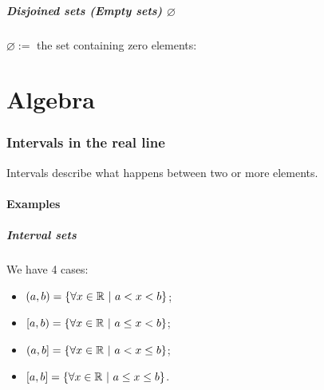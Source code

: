 \documentclass{article}
\let\emptyset\varnothing
\begin{document}
\newpage
\subsubsection{Disjoined sets (Empty sets) $\emptyset$}
$\emptyset :=$ the set containing zero elements:
\figbox{$A \cap B = \emptyset$}

\begin{figure}[ht!]
    \begin{center}
    \end{center}
\end{figure}

\newpage
\part{Algebra}
\section{Intervals in the real line}
Intervals describe what happens between two or more elements.

\subsection{Examples}
\subsubsection{Interval sets}
We have 4 cases:
\begin{itemize}
    \item $(a,b) = \left\{\forall x \in \mathbb{R} \ |\  a<x<b\right\}$;
    \item $\left[a,b\right) = \left\{\forall x \in \mathbb{R} \ |\  a\leq x<b\right\}$;
    \item $\left(a,b\right] = \left\{\forall x \in \mathbb{R} \ |\  a<x\leq b\right\}$;
    \item $\left[a,b\right] = \left\{\forall x \in \mathbb{R} \ |\  a\leq x\leq b\right\}$.
\end{itemize}
\end{document}
